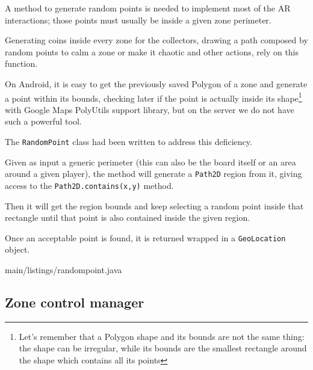 			A method to generate random points is needed to implement most of the AR interactions; those points must usually be inside a given zone perimeter.
			
			Generating coins inside every zone for the collectors, drawing a path composed by random points to calm a zone or make it chaotic and other actions, rely on this function.
			
			On Android, it is easy to get the previously saved Polygon of a zone and generate a point within its bounds, checking later if the point is actually inside its shape\footnote{Let's remember that a Polygon shape and its bounds are not the same thing: the shape can be irregular, while its bounds are the smallest rectangle around the shape which contains all its points} with Google Maps PolyUtils support library, but on the server we do not have such a powerful tool.
			
			The \lstinline|RandomPoint| class had been written to address this deficiency.
			
			Given as input a generic perimeter (this can also be the board itself or an area around a given player), the method will generate a \lstinline|Path2D| region from it, giving access to the \lstinline|Path2D.contains(x,y)| method.
			
			Then it will get the region bounds and keep selecting a random point inside that rectangle until that point is also contained inside the given region.
			
			Once an acceptable point is found, it is returned wrapped in a \lstinline|GeoLocation| object.
			
			
			{main/listings/randompoint.java}
		
		\subsection{Zone control manager}\label{focus:control}
		
